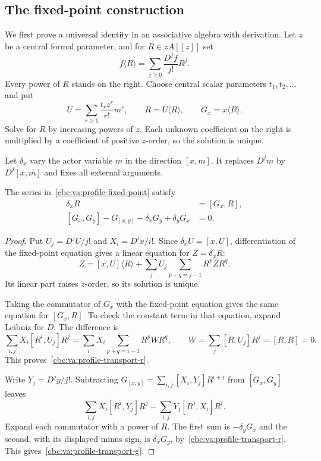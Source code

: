 \subsection{The fixed-point construction}

We first prove a universal identity in an associative
algebra with derivation. Let $z$ be a central formal
parameter, and for $R\in zA[[z]]$ set
\[
 f\langle R\rangle
   =\sum_{j\geq0}\frac{D^jf}{j!}R^j.
\]
Every power of $R$ stands on the right.
Choose central scalar parameters $t_1,t_2,\ldots$ and put
\begin{equation}\label{cbc:va:profile-fixed-point}
 U=\sum_{r\geq1}\frac{t_rz^r}{r!}m^r,\qquad
 R=U\langle R\rangle,\qquad G_x=x\langle R\rangle.
\end{equation}
Solve for $R$ by increasing powers of $z$.
Each unknown coefficient on the right is multiplied
by a coefficient of positive $z$-order, so the
solution is unique.

Let $\delta_x$ vary the actor variable $m$ in the
direction $[x,m]$. It replaces $D^jm$ by $D^j[x,m]$
and fixes all external arguments.

\begin{lemma}\label{cbc:va:profile-transport}
The series in~\eqref{cbc:va:profile-fixed-point} satisfy
\begin{align}
 \delta_xR&=[G_x,R],\label{cbc:va:profile-transport-r}\\
 [G_x,G_y]-G_{[x,y]}-\delta_xG_y+\delta_yG_x&=0.
 \label{cbc:va:profile-transport-g}
\end{align}
\end{lemma}
\begin{proof}
Put $U_j=D^jU/j!$ and $X_i=D^ix/i!$.
Since $\delta_xU=[x,U]$, differentiation of the
fixed-point equation gives a linear equation for
$Z=\delta_xR$:
\[
 Z=[x,U]\langle R\rangle+
       \sum_jU_j\sum_{p+q=j-1}R^pZR^q.
\]
Its linear part raises $z$-order, so its solution is
unique.

Taking the commutator of $G_x$ with the
fixed-point equation gives the same equation for
$[G_x,R]$. To check the constant term in that
equation, expand Leibniz for $D$. The difference is
\[
 \sum_{i,j}X_i[R^i,U_j]R^j
   =\sum_iX_i\sum_{p+q=i-1}R^pWR^q,
 \qquad
 W=\sum_j[R,U_j]R^j=[R,R]=0.
\]
This proves~\eqref{cbc:va:profile-transport-r}.

Write $Y_j=D^jy/j!$. Subtracting
$G_{[x,y]}=\sum_{i,j}[X_i,Y_j]R^{i+j}$ from
$[G_x,G_y]$ leaves
\[
 \sum_{i,j}X_i[R^i,Y_j]R^j
       -\sum_{i,j}Y_j[R^j,X_i]R^i.
\]
Expand each commutator with a power of $R$.
The first sum is $-\delta_yG_x$ and the second,
with its displayed minus sign, is $\delta_xG_y$,
by~\eqref{cbc:va:profile-transport-r}.
This gives~\eqref{cbc:va:profile-transport-g}.
\end{proof}

